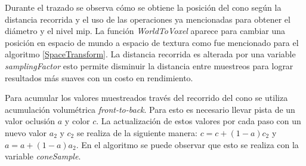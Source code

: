 Durante el trazado se observa cómo se obtiene la posición del cono según la distancia recorrida y el uso de las operaciones ya mencionadas para obtener el diámetro y el nivel mip. La función \emph{WorldToVoxel} aparece para cambiar una posición en espacio de mundo a espacio de textura como fue mencionado para el algoritmo \ref{SpaceTransform}. La distancia recorrida es alterada por una variable \emph{samplingFactor} esto permite disminuir la distancia entre muestreos para lograr resultados más suaves con un costo en rendimiento.

Para acumular los valores muestreados través del recorrido del cono se utiliza acumulación volumétrica \emph{front-to-back}. Para esto es necesario llevar pista de un valor oclusión $a$ y color $c$. La actualización de estos valores por cada paso con un nuevo valor $a_2$ y $c_2$ se realiza de la siguiente manera: $c=c+(1-a)c_2$ y $a=a+(1-a)a_2$. En el algoritmo se puede observar que esto se realiza con la variable \emph{coneSample}.

